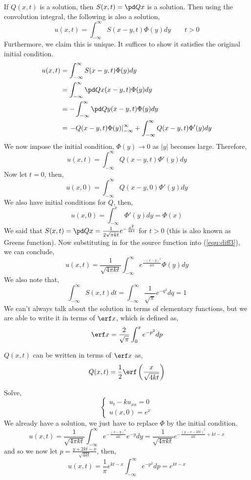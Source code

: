 If $Q(x, t)$ is a solution, then $S(x, t) = \pd Q x$ is a solution. Then using the convolution integral, the following is also a solution,
\begin{equation}
  u(x, t) = \int_{-\infty}^\infty S(x - y, t)\Phi(y) dy \qquad t > 0 \tag{$*$}\label{equ:diff3}
\end{equation}
Furthermore, we claim this is unique. It suffices to show it satisfies the original initial condition.
\begin{align*}
  u(x, t) &= \int_{-\infty}^\infty S(x - y, t)\Phi(y)dy \\
  &= \int_{-\infty}^\infty \pd Q x (x - y, t) \Phi(y)dy \\
  &= -\int_{-\infty}^\infty \pd Q y (x - y, t) \Phi(y)dy \\
  &= \left.-Q(x - y, t)\Phi(y)\right|_{-\infty}^\infty + \int_{-\infty}^\infty Q(x - y, t)\Phi'(y)dy
\end{align*}
We now impose the initial condition, $\Phi(y) \to 0$ as $|y|$ becomes large. Therefore,
$$ u(x, t) = \int_{-\infty}^\infty Q(x - y, t)\Phi'(y)dy $$
Now let $t = 0$, then,
$$ u(x, 0) = \int_{-\infty}^\infty Q(x - y, 0)\Phi'(y)dy $$
We also have initial conditions for $Q$, then,
$$ u(x, 0) = \int_{-\infty}^x \Phi'(y)dy = \Phi(x) $$
We said that $S(x, t) = \pd Q x = \frac{1}{2\sqrt{\pi k t}} e^{-\frac{x^2}{4kt}}$ for $t > 0$ (this is also known as Greens function). Now substituting in for the source function into (\ref{equ:diff3}), we can conclude,
$$ u(x, t) = \frac{1}{\sqrt{4\pi kt}}\int_{-\infty}^\infty e^{\frac{-(x - y)^2}{4kt}}\Phi(y)dy $$
We also note that,
$$ \int_{-\infty}^\infty S(x, t)dt = \int_{-\infty}^\infty \frac{1}{\sqrt \pi} e^{-q^2}dq = 1 $$
We can't always talk about the solution in terms of elementary functions, but we are able to write it in terms of $\erf x$, which is defined as,
$$ \erf x = \frac{2}{\sqrt \pi} \int_0^x e^{-p^2}dp $$

\begin{eg}
  $Q(x, t)$ can be written in terms of $\erf x$ as,
  $$ Q(x, t) = \frac{1}{2}\erf\left( \frac{x}{\sqrt{4kt}} \right) $$
\end{eg}

\begin{eg}
  Solve,
  $$ \begin{cases}
    u_t - ku_{xx} = 0\\
    u(x, 0) = e^x
  \end{cases} $$
  We already have a solution, we just have to replace $\Phi$ by the initial condition.
  $$ u(x, t) = \frac{1}{\sqrt{4\pi kt}}\int_{-\infty}^\infty  e^{-\frac{(x - y)^2}{4kt}}e^{-y}dy = \frac{1}{\sqrt{4\pi kt}}e^{-\frac{(y - x - 2kt)^2}{4kt} + kt - x}$$
  and so we now let $p = \frac{y + 2kt - x}{\sqrt{4kt}}$, then,
  $$ u(x, t) = \frac{1}{\pi}e^{kt - x}\int_{-\infty}^\infty e^{-p^2}dp = e^{kt - x} $$
\end{eg}

